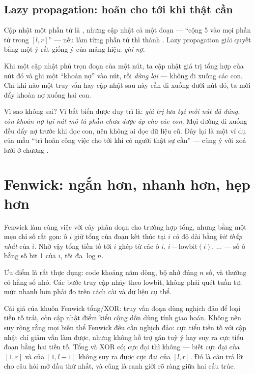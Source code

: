 \documentclass[../../algorithm.tex]{subfiles}
\begin{document}
\subsection{Lazy propagation: hoãn cho tới khi thật cần}

Cập nhật một phần tử là , nhưng cập nhật cả một đoạn --- ``cộng 5 vào mọi phần tử trong \([l,r]\)'' --- nếu làm từng phần tử thì thành . Lazy propagation giải quyết bằng một ý rất giống ý của mảng hiệu: \emph{ghi nợ}.

Khi một cập nhật phủ trọn đoạn của một nút, ta cập nhật giá trị tổng hợp của nút đó và ghi một ``khoản nợ'' vào nút, rồi \emph{dừng lại} --- không đi xuống các con. Chỉ khi nào một truy vấn hay cập nhật sau này cần đi xuống dưới nút đó, ta mới đẩy khoản nợ xuống hai con.

Vì sao không sai? Vì bất biến được duy trì là: \emph{giá trị lưu tại mỗi nút đã đúng, còn khoản nợ tại nút mô tả phần chưa được áp cho các con}. Mọi đường đi xuống đều đẩy nợ trước khi đọc con, nên không ai đọc dữ liệu cũ. Đây lại là một ví dụ của mẫu ``trì hoãn công việc cho tới khi có người thật sự cần'' --- cùng ý với xoá lười ở chương .

\section{Fenwick: ngắn hơn, nhanh hơn, hẹp hơn}

Fenwick làm cùng việc với cây phân đoạn cho trường hợp tổng, nhưng bằng một mẹo chỉ số rất gọn: ô \(i\) giữ tổng của đoạn kết thúc tại \(i\) có độ dài bằng \emph{bit thấp nhất} của \(i\). Nhờ vậy tổng tiền tố tới \(i\) ghép từ các ô \(i,\, i - \text{lowbit}(i),\, \dots\) --- số ô bằng số bit 1 của \(i\), tối đa \(\log n\).

Ưu điểm là rất thực dụng: code khoảng năm dòng, bộ nhớ đúng \(n\) số, và thường có hằng số nhỏ. Các bước truy cập nhảy theo lowbit, không phải quét tuần tự; mức nhanh hơn phải đo trên cách cài và dữ liệu cụ thể.

Cái giá của khuôn Fenwick tổng/XOR: truy vấn đoạn dùng nghịch đảo để loại tiền tố trái, còn cập nhật điểm kiểu cộng dồn dùng tính giao hoán. Không nên suy rộng rằng mọi biến thể Fenwick đều cần nghịch đảo: cực tiểu tiền tố với cập nhật chỉ giảm vẫn làm được, nhưng không hỗ trợ gán tuỳ ý hay suy ra cực tiểu đoạn bằng hai tiền tố. Tổng và XOR có; cực đại thì không --- biết cực đại của \([1,r]\) và của \([1,l-1]\) không suy ra được cực đại của \([l,r]\). Đó là câu trả lời cho câu hỏi mở đầu thứ nhất, và cũng là ranh giới rõ ràng giữa hai cấu trúc.
\end{document}
